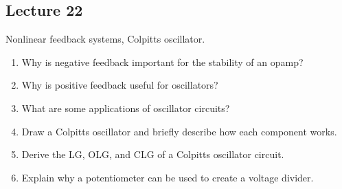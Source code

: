 \subsection*{Lecture 22}

Nonlinear feedback systems, Colpitts oscillator.

\begin{enumerate}
  \item Why is negative feedback important for the stability of an opamp?
  \item Why is positive feedback useful for oscillators?
  \item What are some applications of oscillator circuits?
  \item Draw a Colpitts oscillator and briefly describe how each component works.
  \item Derive the LG, OLG, and CLG of a Colpitts oscillator circuit.
  \item Explain why a potentiometer can be used to create a voltage divider.
\end{enumerate}